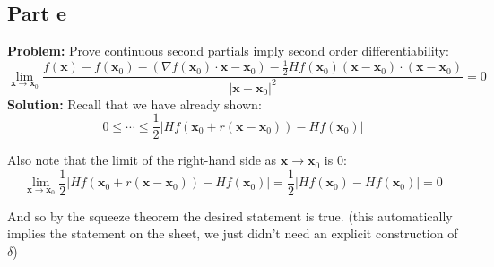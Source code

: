 \documentclass{article}
\begin{document}
\subsection*{Part e}
\textbf{Problem:} Prove continuous second partials imply second order differentiability:
$$\lim_{\mathbf x\to\mathbf x_0}\frac{f(\mathbf x)-f(\mathbf x_0)-(\nabla f(\mathbf x_0)\cdot\mathbf x-\mathbf x_0)-\frac{1}{2}Hf(\mathbf x_0)(\mathbf x-\mathbf x_0)\cdot(\mathbf x-\mathbf x_0)}{|\mathbf x-\mathbf x_0|^2}=0$$
\textbf{Solution:} Recall that we have already shown:
$$0\le\cdots\le\frac{1}{2}|Hf(\mathbf x_0+r(\mathbf x-\mathbf x_0))-Hf(\mathbf x_0)|$$

Also note that the limit of the right-hand side as $\mathbf x\to\mathbf x_0$ is 0:
$$\lim_{\mathbf x\to\mathbf x_0}\frac{1}{2}|Hf(\mathbf x_0+r(\mathbf x-\mathbf x_0))-Hf(\mathbf x_0)|=\frac{1}{2}|Hf(\mathbf x_0)-Hf(\mathbf x_0)|=0$$

And so by the squeeze theorem the desired statement is true. (this automatically implies the statement on the sheet, we just didn't need an explicit construction of $\delta$)
\end{document}

